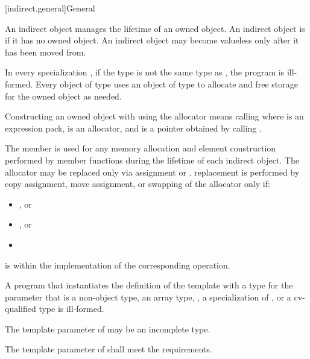 [indirect.general]{General}

\pnum
An indirect object manages the lifetime of an owned object.
An indirect object is
 if it has no owned object.
An indirect object may become valueless only after it has been moved from.

\pnum
In every specialization ,
if the type 
is not the same type as ,
the program is ill-formed.
Every object of type 
uses an object of type  to allocate and free storage
for the owned object as needed.

\pnum
Constructing an owned object with 
using the allocator  means calling
 where
 is an expression pack,
 is an allocator, and
 is a pointer obtained by
calling .

\pnum
The member  is used for
any memory allocation and element construction
performed by member functions
during the lifetime of each indirect object.
The allocator  may be replaced
only via assignment or .
 replacement is performed by
copy assignment,
move assignment, or
swapping of the allocator
only if:
\begin{itemize}
\item
{}, or
\item
{}, or
\item
{}
\end{itemize}
is  within the implementation of
the corresponding  operation.

\pnum
A program that instantiates the definition of
the template  with
a type for the  parameter that is
a non-object type,
an array type,
,
a specialization of , or
a cv-qualified type
is ill-formed.

\pnum
The template parameter  of 
may be an incomplete type.

\pnum
The template parameter  of 
shall meet the  requirements.

